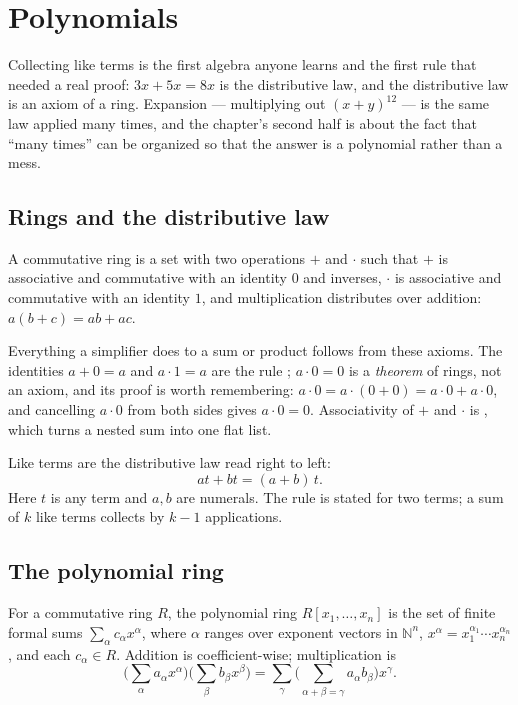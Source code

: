 \chapter{Polynomials}\label{ch:poly}

Collecting like terms is the first algebra anyone learns and the first rule that needed a real
proof: $3x + 5x = 8x$ is the distributive law, and the distributive law is an axiom of a ring.
Expansion --- multiplying out $(x + y)^{12}$ --- is the same law applied many times, and the
chapter's second half is about the fact that ``many times'' can be organized so that the answer
is a polynomial rather than a mess.

\section{Rings and the distributive law}

\begin{definition}
  A commutative ring is a set with two operations $+$ and $\cdot$ such that $+$ is associative
  and commutative with an identity $0$ and inverses, $\cdot$ is associative and commutative with
  an identity $1$, and multiplication distributes over addition:
  $a(b + c) = ab + ac$.
\end{definition}

Everything a simplifier does to a sum or product follows from these axioms. The identities
$a + 0 = a$ and $a \cdot 1 = a$ are the rule ; $a \cdot 0 = 0$ is a
\emph{theorem} of rings, not an axiom, and its proof is worth remembering:
$a \cdot 0 = a \cdot (0 + 0) = a \cdot 0 + a \cdot 0$, and cancelling $a \cdot 0$ from both sides
gives $a \cdot 0 = 0$. Associativity of $+$ and $\cdot$ is , which turns a nested
sum into one flat list.

Like terms are the distributive law read right to left:
\[
  a t + b t = (a + b)\, t .
\]
Here $t$ is any term and $a, b$ are numerals. The rule is stated for two terms; a sum of $k$ like
terms collects by $k - 1$ applications.

\section{The polynomial ring}

\begin{definition}[Polynomials]
  For a commutative ring $R$, the polynomial ring $R[x_1, \ldots, x_n]$ is the set of finite
  formal sums $\sum_\alpha c_\alpha x^\alpha$, where $\alpha$ ranges over exponent vectors in
  $\mathbb{N}^n$, $x^\alpha = x_1^{\alpha_1} \cdots x_n^{\alpha_n}$, and each $c_\alpha \in R$.
  Addition is coefficient-wise; multiplication is
  \[
    \Big(\sum_\alpha a_\alpha x^\alpha\Big)\Big(\sum_\beta b_\beta x^\beta\Big)
      = \sum_\gamma \Big(\sum_{\alpha + \beta = \gamma} a_\alpha b_\beta\Big) x^\gamma .
  \]
\end{definition}

